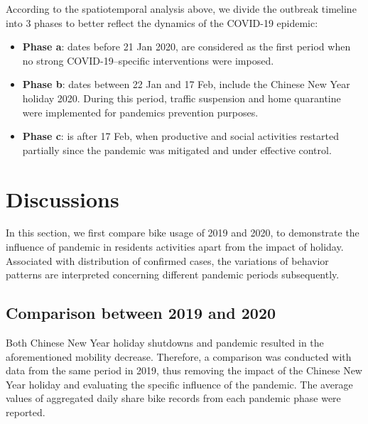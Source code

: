 \documentclass[ijgi,submit,moreauthors,pdftex]{Definitions/mdpi}
\begin{document}
According to the spatiotemporal analysis above, we divide the outbreak timeline into 3 phases to better reflect the dynamics of the COVID-19 epidemic:
\begin{itemize}
	\item \textbf{Phase a}: dates before 21 Jan 2020, are considered as the first period when no strong COVID-19–specific interventions were imposed.
	\item \textbf{Phase b}: dates between 22 Jan and 17 Feb, include the Chinese New Year holiday 2020. During this period, traffic suspension and home quarantine were implemented for pandemics prevention purposes.
	\item \textbf{Phase c}: is after 17 Feb, when productive and social activities restarted partially since the pandemic was mitigated and under effective control.
\end{itemize}







\section{Discussions}\label{sec:discussions}
In this section, we first compare bike usage of 2019 and 2020, to demonstrate the influence of pandemic in residents activities apart from the impact of holiday.
Associated with distribution of confirmed cases, the variations of behavior patterns are interpreted concerning different pandemic periods subsequently.  
\subsection{Comparison between 2019 and 2020}%

Both Chinese New Year holiday shutdowns and pandemic resulted in the aforementioned mobility decrease.
Therefore, a comparison was conducted with data from the same period in 2019, thus removing the impact of the Chinese New Year holiday and evaluating the specific influence of the pandemic.  
The average values of aggregated daily share bike records from each pandemic phase were reported.
\end{document}
